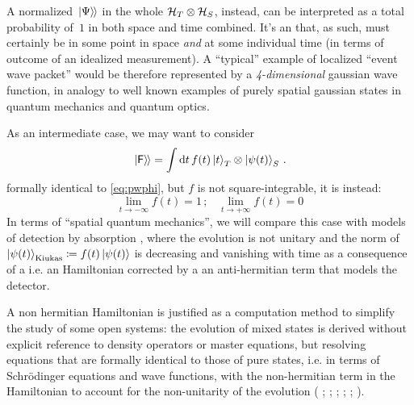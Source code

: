 A normalized $\left.\left| \Psi \right\rangle\hspace{-0.115em}\right\rangle$ in the whole $\mathcal{H}_T \otimes \mathcal{H}_S$,
instead,
can be interpreted as a total probability of~$1$ in both space and time combined.
It's an  that, as such, must certainly be in some point in space
\emph{and} at some individual time (in terms of outcome of an idealized measurement).
A ``typical'' example of localized ``event wave packet'' would be
therefore represented by
a \emph{4-dimensional} gaussian wave function,
in analogy to well known examples of purely spatial gaussian states
in quantum mechanics and quantum optics.

As an intermediate case, we may want to consider
\begin{equation}\label{eq:pwf}
  \left.\left| \mathsf{F} \right\rangle\hspace{-0.115em}\right\rangle =
    \int \dd{t} f(t) \ket{t}_T \otimes \ket{\psi(t)}_S \, \text{.}
\end{equation}
formally identical to \eqref{eq:pwphi},
but $f$ is not square-integrable, it is instead:
\begin{equation}
  \lim_{t\to -\infty} f(t) = 1 \, \text{;} \quad
  \lim_{t\to +\infty} f(t) = 0
\end{equation}
In terms of ``spatial quantum mechanics'', we will compare this case with
models of detection by absorption \parencite{RuschhauptAbsorption},
where the evolution is not unitary and
the norm of
$\ket{\psi(t)}_{\mathrm{Kiukas}} \coloneqq f(t)\ket{\psi(t)}$
is decreasing and vanishing with time
as a consequence of a 
i.e.
an Hamiltonian corrected by a an anti-hermitian term
that models the detector.

A non hermitian Hamiltonian is justified as a computation method
to simplify the study of some open systems: the evolution of mixed
states is derived without explicit reference to density operators
or master equations, but resolving equations that are formally
identical to those of pure states,
i.e. in terms of
Schr{\"o}dinger equations and wave functions,
with the non-hermitian term in the Hamiltonian
to account for the non-unitarity of the evolution
(%
  \cite[Ch. 6]{TQM2};
  \cite{Wave-function_approach};
  \cite{HowToResetAnAtom};
  \cite{TheQuantumJumpApproach};
  \cite[\S 8.5 ``The `quantum jump' approach to damping'' and particularly \S 8.5.2 ``The wave function Monte Carlo approach to damping'']{ScullyZubairy};
  \cite[particularly \S 6.7.1 ``Simulating Quantum Trajectories'']{WallsMilburn}%
).

